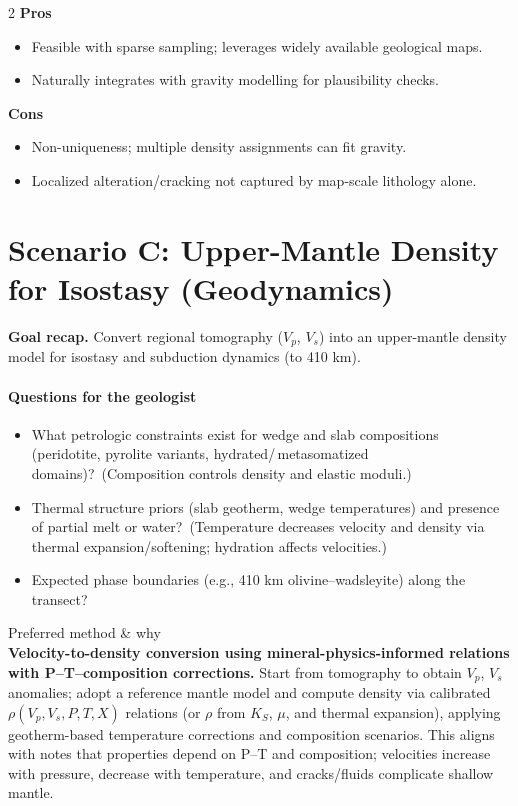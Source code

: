 \documentclass[11pt,a4paper]{article}
\begin{document}
\begin{multicols}{2}
\textbf{Pros}
\begin{itemize}[leftmargin=*]
  \item Feasible with sparse sampling; leverages widely available geological maps.\label{notesref}
  \item Naturally integrates with gravity modelling for plausibility checks.
\end{itemize}
\columnbreak
\textbf{Cons}
\begin{itemize}[leftmargin=*]
  \item Non-uniqueness; multiple density assignments can fit gravity.\label{notesref}
  \item Localized alteration/cracking not captured by map-scale lithology alone.
\end{itemize}
\end{multicols}

\section*{Scenario C: Upper-Mantle Density for Isostasy (Geodynamics)}
\textbf{Goal recap.} Convert regional tomography ($V_p$, $V_s$) into an upper-mantle density model for isostasy and subduction dynamics (to 410 km).

\paragraph{Questions for the geologist}
\begin{itemize}[leftmargin=*]
  \item What petrologic constraints exist for wedge and slab compositions (peridotite, pyrolite variants, hydrated/\,metasomatized domains)?~(Composition controls density and elastic moduli.)\label{notesref}
  \item Thermal structure priors (slab geotherm, wedge temperatures) and presence of partial melt or water?~(Temperature decreases velocity and density via thermal expansion/softening; hydration affects velocities.)\label{notesref}
  \item Expected phase boundaries (e.g., 410 km olivine--wadsleyite) along the transect?
\end{itemize}

Preferred method \& why\\
\textbf{Velocity-to-density conversion using mineral-physics-informed relations with P--T--composition corrections.} Start from tomography to obtain $V_p$, $V_s$ anomalies; adopt a reference mantle model and compute density via calibrated $\rho(V_p, V_s, P, T, X)$ relations (or $\rho$ from $K_S$, $\mu$, and thermal expansion), applying geotherm-based temperature corrections and composition scenarios. This aligns with notes that properties depend on P--T and composition; velocities increase with pressure, decrease with temperature, and cracks/fluids complicate shallow mantle.\label{notesref}
\end{document}
